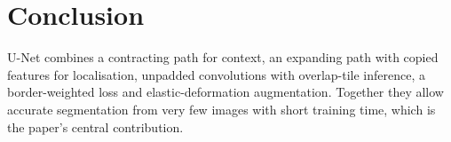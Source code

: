\documentclass{article}
\begin{document}
\section{Conclusion}
U-Net combines a contracting path for context, an expanding path with copied features for localisation, unpadded convolutions with overlap-tile inference, a border-weighted loss and elastic-deformation augmentation. Together they allow accurate segmentation from very few images with short training time, which is the paper's central contribution.



\end{document}
